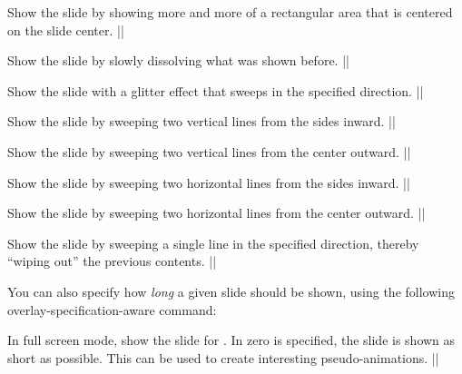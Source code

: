\begin{command}{\transboxout{}}
  Show the slide by showing more and more of a rectangular area that
  is centered on the slide center.
  \example|\transboxout|
\end{command}
 
\begin{command}{\transdissolve{}}
  Show the slide by slowly dissolving what was shown before.
  \example|\transdissolve[duration=0.2]|
\end{command}
  
\begin{command}{\transglitter{}}
  Show the slide with a glitter effect that sweeps in the specified
  direction.
  \example||
\end{command}
  
\begin{command}{\transsplitverticalin{}}
  Show the slide by sweeping two vertical lines from the sides inward.
  \example|\transsplitverticalin|
\end{command}
  
\begin{command}{\transsplitverticalout{}}
  Show the slide by sweeping two vertical lines from the center outward.
  \example|\transsplitverticalout|
\end{command}
  
\begin{command}{\transsplithorizontalin{}}
  Show the slide by sweeping two horizontal lines from the sides inward.
  \example|\transsplithorizontalin|
\end{command}
  
\begin{command}{\transsplithorizontalout{}}
  Show the slide by sweeping two horizontal lines from the center outward.
  \example|\transsplithorizontalout|
\end{command}
 
\begin{command}{\transwipe{}}
  Show the slide by sweeping a single line in the specified direction,
  thereby ``wiping out'' the previous contents.
  \example|\transwipe[direction=90]|
\end{command}


You can also specify how \emph{long} a given slide should be shown,
using the following overlay-specification-aware command:

\begin{command}{\transduration{}}
  In full screen mode, show the slide for .
  In zero is specified, the slide is shown as short as possible. This
  can be used to create interesting pseudo-animations.
  \example||
\end{command}




